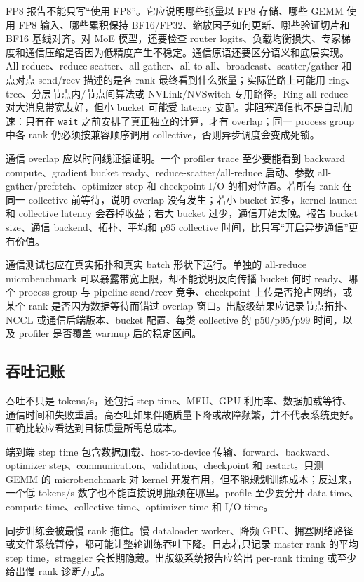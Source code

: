 \documentclass[UTF8,zihao=-4,openany]{ctexbook}
\begin{document}
FP8 报告不能只写“使用 FP8”。它应说明哪些张量以 FP8 存储、哪些 GEMM 使用 FP8 输入、哪些累积保持 BF16/FP32、缩放因子如何更新、哪些验证切片和 BF16 基线对齐。对 MoE 模型，还要检查 router logits、负载均衡损失、专家梯度和通信压缩是否因为低精度产生不稳定。通信原语还要区分语义和底层实现。All-reduce、reduce-scatter、all-gather、all-to-all、broadcast、scatter/gather 和点对点 send/recv 描述的是各 rank 最终看到什么张量；实际链路上可能用 ring、tree、分层节点内/节点间算法或 NVLink/NVSwitch 专用路径。Ring all-reduce 对大消息带宽友好，但小 bucket 可能受 latency 支配。非阻塞通信也不是自动加速：只有在 \texttt{wait} 之前安排了真正独立的计算，才有 overlap；同一 process group 中各 rank 仍必须按兼容顺序调用 collective，否则异步调度会变成死锁。

通信 overlap 应以时间线证据证明。一个 profiler trace 至少要能看到 backward compute、gradient bucket ready、reduce-scatter/all-reduce 启动、参数 all-gather/prefetch、optimizer step 和 checkpoint I/O 的相对位置。若所有 rank 在同一 collective 前等待，说明 overlap 没有发生；若小 bucket 过多，kernel launch 和 collective latency 会吞掉收益；若大 bucket 过少，通信开始太晚。报告 bucket size、通信 backend、拓扑、平均和 p95 collective 时间，比只写“开启异步通信”更有价值。

通信测试也应在真实拓扑和真实 batch 形状下运行。单独的 all-reduce microbenchmark 可以暴露带宽上限，却不能说明反向传播 bucket 何时 ready、哪个 process group 与 pipeline send/recv 竞争、checkpoint 上传是否抢占网络，或某个 rank 是否因为数据等待而错过 overlap 窗口。出版级结果应记录节点拓扑、NCCL 或通信后端版本、bucket 配置、每类 collective 的 p50/p95/p99 时间，以及 profiler 是否覆盖 warmup 后的稳定区间。

\subsection{吞吐记账}
吞吐不只是 tokens/s，还包括 step time、MFU、GPU 利用率、数据加载等待、通信时间和失败重启。高吞吐如果伴随质量下降或故障频繁，并不代表系统更好。正确比较应看达到目标质量所需总成本。

端到端 step time 包含数据加载、host-to-device 传输、forward、backward、optimizer step、communication、validation、checkpoint 和 restart。只测 GEMM 的 microbenchmark 对 kernel 开发有用，但不能规划训练成本；反过来，一个低 tokens/s 数字也不能直接说明瓶颈在哪里。profile 至少要分开 data time、compute time、collective time、optimizer time 和 I/O time。

同步训练会被最慢 rank 拖住。慢 dataloader worker、降频 GPU、拥塞网络路径或文件系统暂停，都可能让整轮训练吞吐下降。日志若只记录 master rank 的平均 step time，straggler 会长期隐藏。出版级系统报告应给出 per-rank timing 或至少给出慢 rank 诊断方式。
\end{document}
